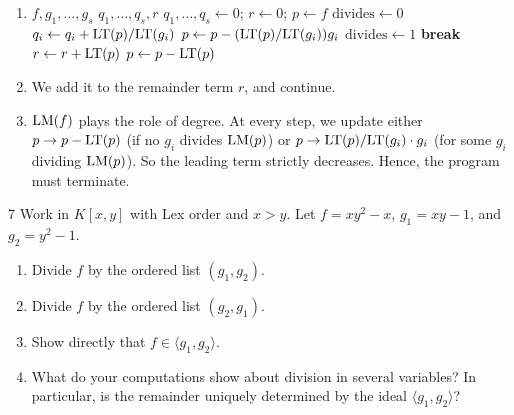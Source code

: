 \documentclass[Notebook.tex]{subfiles}
\begin{document}
\begin{solution}
    \bbni
    \begin{enumerate}[label=(\alph*),ref=\theenumi\alph*]
        \item 
        \begin{algorithmic}
        \Require $f, g_1,\ldots,g_s$
        \Ensure $q_1,\ldots,q_s,r$
        \State $q_1,\ldots,q_s \gets 0$; $r\gets 0$; $p\gets f$
            \State $\mathrm{divides}\gets 0$
                    \State $q_i\gets q_i+\text{LT}(p)/\text{LT}(g_i)$
                    \State $p\gets p-(\text{LT}(p)/\text{LT}(g_i))g_i$
                    \State $\mathrm{divides}\gets 1$
                    \State \textbf{break}
                \EndIf
            \EndFor
                \State $r\gets r+\text{LT}(p)$
                \State $p\gets p-\text{LT}(p)$
            \EndIf
        \EndWhile
        \end{algorithmic}

        \item We add it to the remainder term $r$, and continue. 
        
        \item $\text{LM}(f)$ plays the role of degree. At every step, we update either $p \rightarrow p - \text{LT}(p)$ (if no $g_i$ divides $\text{LM}(p)$) or $p \rightarrow \text{LT}(p)/\text{LT}(g_i) \cdot g_i$ (for some $g_i$ dividing $\text{LM}(p)$). So the leading term strictly decreases. Hence, the program must terminate.  
    \end{enumerate}
\end{solution}

\newpage 

\begin{problem}{7}
    Work in $K[x,y]$ with Lex order and $x > y$. Let $f = xy^2 - x$, $g_1 = xy - 1$, and $g_2 = y^2 - 1$.

    \begin{enumerate}[label=(\alph*),ref=\theenumi\alph*]
        \item Divide $f$ by the ordered list $(g_1, g_2)$. 
        \item Divide $f$ by the ordered list $(g_2, g_1)$.
        \item Show directly that $f \in \langle g_1, g_2 \rangle$.
        \item What do your computations show about division in several variables? In particular, is the remainder uniquely determined by the ideal $\langle g_1, g_2 \rangle$?
    \end{enumerate}
\end{problem}
\end{document}
